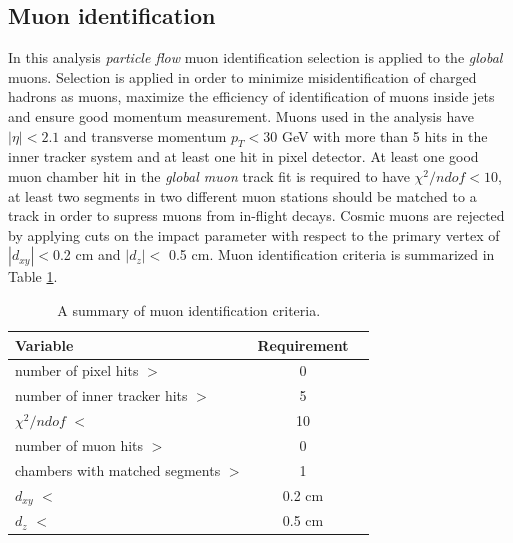 
\subsection{Muon identification}

In this analysis \textit{particle flow} muon identification selection is applied to the \textit{global} muons. Selection is applied in order to minimize misidentification of charged hadrons as muons, maximize the efficiency of identification of muons inside jets and ensure good momentum measurement. Muons used in the analysis have $|\eta|<2.1$ and transverse momentum $p_T<30$ GeV with more than 5 hits in the inner tracker system and at least one hit in pixel detector. At least one good muon chamber hit in the \textit{global muon} track fit is required to have $\chi^2/ndof<10$, at least two segments in two different muon stations should be matched to a track in order to supress muons from in-flight decays. Cosmic muons are rejected by applying cuts on the impact parameter with respect to the primary vertex of $|d_{xy}|<$0.2 cm and $|d_z|<$ 0.5 cm. Muon identification criteria is summarized in Table \ref{tab:muID}.

  \begin{table}[h]
\centering
  \caption{A summary of muon identification criteria.}
  \label{tab:muID}
  \begin{tabular}{ l  c c}
      \hline
      \hline
      	Variable & Requirement \\
      	\hline
    		number of pixel hits $>$ &  0 \\
     	number of inner tracker hits $>$ &  5 \\
     	$\chi^2/ndof$ $<$ & 10 \\
		number of muon hits $>$ & 0  \\
		chambers with matched segments $>$ & 1  \\		
		$d_{xy}$ $<$ & 0.2 cm \\
		$d_{z}$ $<$  & 0.5 cm \\
      \hline
      \hline 
  \end{tabular}
\end{table}
 



